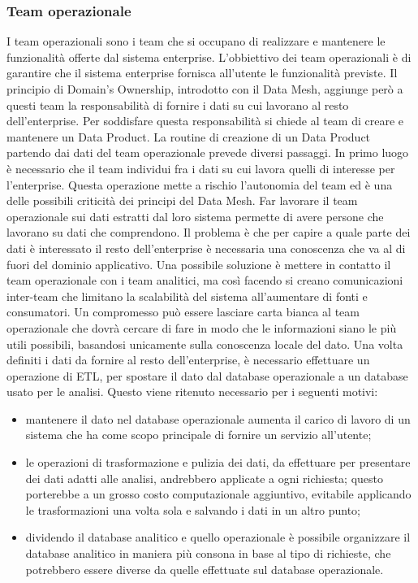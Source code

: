 \documentclass[12pt]{report}
\begin{document}
\subsubsection{Team operazionale}
I team operazionali sono i team che si occupano di realizzare e mantenere le funzionalità offerte dal sistema enterprise.
L'obbiettivo dei team operazionali è di garantire che il sistema enterprise fornisca all'utente le funzionalità previste. 
Il principio di Domain's Ownership, introdotto con il Data Mesh, aggiunge però a questi team la responsabilità di fornire i dati su cui lavorano al resto dell'enterprise.
Per soddisfare questa responsabilità si chiede al team di creare e mantenere un Data Product.
La routine di creazione di un Data Product partendo dai dati del team operazionale prevede diversi passaggi.
In primo luogo è necessario che il team individui fra i dati su cui lavora quelli di interesse per l'enterprise.
Questa operazione mette a rischio l'autonomia del team ed è una delle possibili criticità dei principi del Data Mesh. 
Far lavorare il team operazionale sui dati estratti dal loro sistema permette di avere persone che lavorano su dati che comprendono. 
Il problema è che per capire a quale parte dei dati è interessato il resto dell'enterprise è necessaria una conoscenza che va al di fuori del dominio applicativo. 
Una possibile soluzione è mettere in contatto il team operazionale con i team analitici, ma così facendo si creano comunicazioni inter-team che limitano la scalabilità del sistema all'aumentare di fonti e consumatori.
Un compromesso può essere lasciare carta bianca al team operazionale che dovrà cercare di fare in modo che le informazioni siano le più utili possibili, basandosi unicamente sulla conoscenza locale del dato.
Una volta definiti i dati da fornire al resto dell'enterprise, è necessario effettuare un operazione di ETL, per spostare il dato dal database operazionale a un database usato per le analisi. 
Questo viene ritenuto necessario per i seguenti motivi:
\begin{itemize}
    \item mantenere il dato nel database operazionale aumenta il carico di lavoro di un sistema che ha come scopo principale di fornire un servizio all'utente;
    \item le operazioni di trasformazione e pulizia dei dati, da effettuare per presentare dei dati adatti alle analisi, andrebbero applicate a ogni richiesta; 
    questo porterebbe a un grosso costo computazionale aggiuntivo, evitabile applicando le trasformazioni una volta sola e salvando i dati in un altro punto;
    \item dividendo il database analitico e quello operazionale è possibile organizzare il database analitico in maniera più consona in base al tipo di richieste, che potrebbero essere diverse da quelle effettuate sul database operazionale.
\end{itemize}
\end{document}
